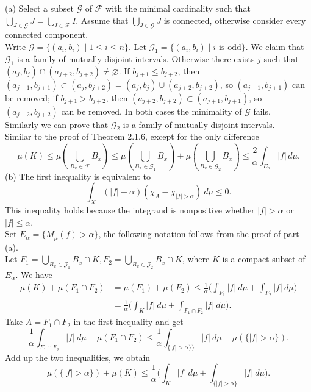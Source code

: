 \begin{itemize}
(a) Select a subset $\mathscr{G}$ of $\mathscr{F}$ with the minimal cardinality such that 
$\bigcup_{J\in \mathscr{G}}J=\bigcup_{I\in \mathscr{F}}I$. 
Assume that $\bigcup_{J\in \mathscr{G}}J$ is connected, 
otherwise consider every connected component. \\
Write $\mathscr{G}=\{(a_i,b_i)\mid 1\leq i\leq n\}$. 
Let $\mathscr{G}_1=\{(a_i,b_i)\mid i\text{ is odd}\}$. 
We claim that $\mathscr{G}_1$ is a family of mutually disjoint intervals. 
Otherwise there exists $j$ such that $(a_j,b_j)\cap(a_{j+2},b_{j+2})\neq \varnothing$. 
If $b_{j+1}\leq b_{j+2}$, then 
$(a_{j+1},b_{j+1})\subset (a_j,b_{j+2})=(a_{j},b_{j})\cup(a_{j+2},b_{j+2})$, 
so $(a_{j+1},b_{j+1})$ can be removed; 
if $b_{j+1}>b_{j+2}$, then $(a_{j+2},b_{j+2})\subset (a_{j+1},b_{j+1})$, 
so $(a_{j+2},b_{j+2})$ can be removed. 
In both cases the minimality of $\mathscr{G}$ fails.
\\Similarly we can prove that $\mathscr{G}_2$ is 
a family of mutually disjoint intervals.\\
Similar to the proof of Theorem 2.1.6, except for the only difference 
$$\mu(K)\leq \mu(\bigcup_{B_x\in \mathscr{F}}B_x)
\leq \mu(\bigcup_{B_x\in \mathscr{G}_1}B_x)
+\mu(\bigcup_{B_x\in \mathscr{G}_2}B_x)\leq\frac2{\alpha}\int_{E_\alpha}|f|\,d\mu.$$
(b) The first inequality is equivalent to 
$$\int_X(\vert f\vert-\alpha)(\chi_A-\chi_{\vert f\vert >\alpha})\>d\mu\le0.$$
This inequality holds because the integrand is nonpositive 
whether $\vert f \vert>\alpha $ or $\vert f\vert\leq\alpha$.\\
Set $E_\alpha=\{M_{\mu}(f)>\alpha\}$, the following notation follows from the proof of part (a).\\
Let $F_1=\bigcup_{B_x\in \mathscr{G}_1}B_x\cap K,F_2=\bigcup_{B_x\in \mathscr{G}_2}B_x\cap K$, 
where $K$ is a compact subset of $E_\alpha$. We have
\begin{align*}
\mu(K)+\mu(F_1\cap F_2)
&=\mu(F_1)+\mu(F_2)\leq\frac{1}{\alpha}\bigg(\int_{F_1}\vert f\vert\>d\mu +\int_{F_2}\vert f\vert\>d\mu \bigg)\\
&=\frac1{\alpha}\bigg(\int_{K}\vert f\vert\>d\mu +\int_{F_1\cap F_2}\vert f\vert\>d\mu \bigg).
\end{align*}
Take $A=F_1\cap F_2$ in the first inequality and get
$$\frac{1}{\alpha}\int_{F_1\cap F_2}|f|\>d\mu-\mu(F_1\cap F_2)\leq
\frac{1}{\alpha}\int_{\{|f|>\alpha\}\}}|f|\>d\mu-\mu(\{|f|>\alpha\}).$$
Add up the two inequalities, we obtain
$$\mu(\{\vert f\vert >\alpha\})+\mu(K)
\leq\frac1{\alpha}\bigg(\int_{K}\vert f\vert\>d\mu +\int_{\{\vert f\vert >\alpha\}}\vert f\vert\>d\mu \bigg).$$

\end{itemize}
